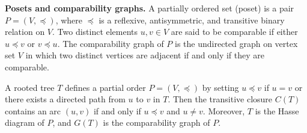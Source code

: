 \documentclass[11pt,reqno]{amsart}
\theoremstyle{definition}
\begin{document}
\noindent
\textbf{Posets and comparability graphs.}
A partially ordered set (poset) is a pair $P=(V,\preceq)$, where $\preceq$ is a reflexive, antisymmetric, and transitive binary relation on $V$. Two distinct elements $u,v\in V$ are said to be comparable if either $u\preceq v$ or $v\preceq u$. The comparability graph of $P$ is the undirected graph on vertex set $V$ in which two distinct vertices are adjacent if and only if they are comparable.

A rooted tree $T$ defines a partial order $P=(V,\preceq)$ by setting
$u\preceq v$ if $u=v$ or there exists a directed path from $u$ to $v$ in $T$.
Then the transitive closure $C(T)$ contains an arc $(u,v)$ if and only if
$u \preceq v$ and $u\neq v$. Moreover, $T$ is the Hasse diagram of $P$, and $G(T)$ is the comparability graph of $P$.
\end{document}
